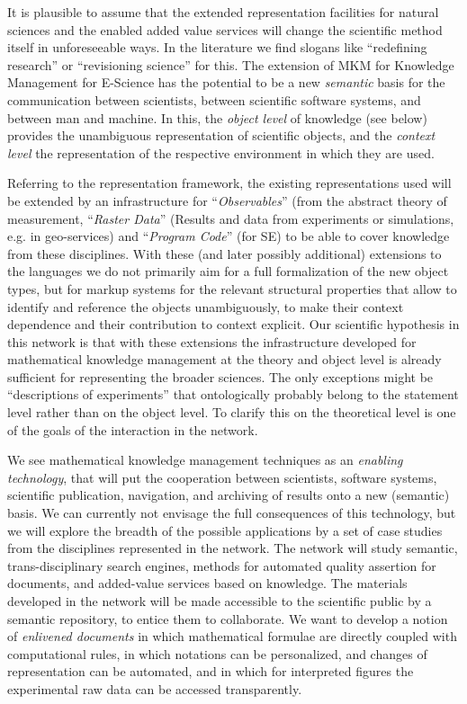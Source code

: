 \documentclass{llncs}
\begin{document}
It is plausible to assume that the extended representation facilities for natural sciences
and the enabled added value services will change the scientific method itself in
unforeseeable ways. In the literature we find slogans like ``redefining research'' or
``revisioning science'' for this. The extension of MKM for Knowledge Management for
E-Science has the potential to be a new {\emph{semantic}} basis for the communication
between scientists, between scientific software systems, and between man and machine. In
this, the {\emph{object level}} of knowledge (see below) provides the unambiguous
representation of scientific objects, and the {\emph{context level}} the representation of
the respective environment in which they are used.

Referring to the representation framework, the existing representations used will be
extended by an infrastructure for ``{\emph{Observables}}'' (from the abstract theory of
measurement\cite{ISN:qmech}\cite{ISN:einf}, ``{\emph{Raster Data}}'' (Results and data
from experiments or simulations, e.g.  in geo-services) and ``{\emph{Program Code}}'' (for
SE) to be able to cover knowledge from these disciplines. With these (and later possibly
additional) extensions to the languages we do not primarily aim for a full formalization
of the new object types, but for markup systems for the relevant structural properties
that allow to identify and reference the objects unambiguously, to make their context
dependence and their contribution to context explicit. Our scientific hypothesis in this
network is that with these extensions the infrastructure developed for mathematical
knowledge management at the theory and object level is already sufficient for representing
the broader sciences. The only exceptions might be ``descriptions of experiments'' that
ontologically probably belong to the statement level rather than on the object level. To
clarify this on the theoretical level is one of the goals of the interaction in the
network.

We see mathematical knowledge management techniques as an {\emph{enabling technology}},
that will put the cooperation between scientists, software systems, scientific
publication, navigation, and archiving of results onto a new (semantic) basis. We can
currently not envisage the full consequences of this technology, but we will explore the
breadth of the possible applications by a set of case studies from the disciplines
represented in the network. The network will study semantic, trans-disciplinary search
engines, methods for automated quality assertion for documents, and added-value services
based on knowledge. The materials developed in the network will be made accessible to the
scientific public by a semantic repository, to entice them to collaborate. We want to
develop a notion of {\emph{enlivened documents}} in which mathematical formulae are
directly coupled with computational rules, in which notations can be personalized, and
changes of representation can be automated, and in which for interpreted figures the
experimental raw data can be accessed transparently.
\end{document}
